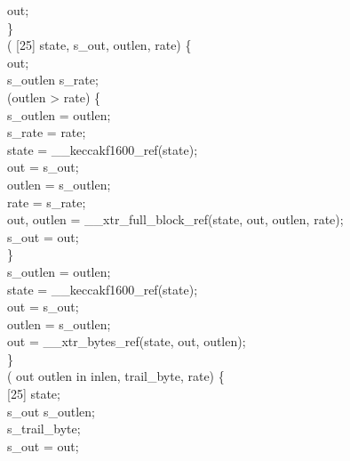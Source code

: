  out;\\
\}\\
  ( [25] state,   s_out,   outlen,   rate) \{\\
  out;\\
  s_outlen s_rate;\\
  (outlen > rate) \{\\
s_outlen = outlen;\\
s_rate = rate;\\
state = __keccakf1600_ref(state);\\
out = s_out;\\
outlen = s_outlen;\\
rate = s_rate;\\
out, outlen = __xtr_full_block_ref(state, out, outlen, rate);\\
s_out = out;\\
\}\\
s_outlen = outlen;\\
state = __keccakf1600_ref(state);\\
out = s_out;\\
outlen = s_outlen;\\
out = __xtr_bytes_ref(state, out, outlen);\\
\}\\
  (  out outlen in inlen,   trail_byte,   rate) \{\\
 [25] state;\\
  s_out s_outlen;\\
  s_trail_byte;\\
s_out = out;\\
